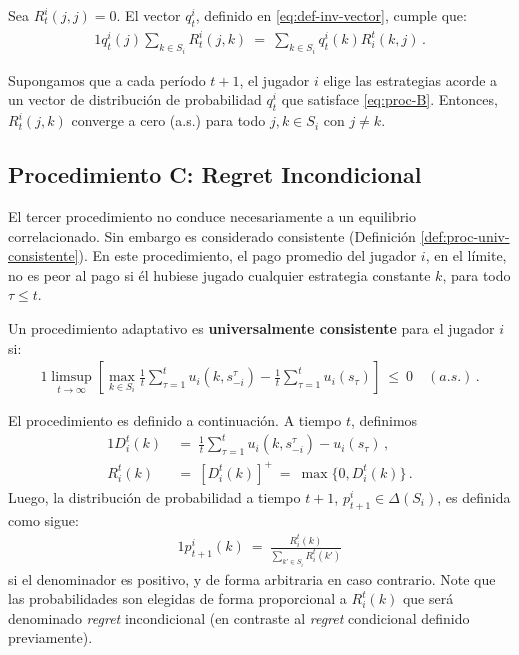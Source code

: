 \begin{theorem}
\label{theo:def-proc-B}
Sea $R_t^i(j, j) = 0$. El vector $q_t^i$, definido en \ref{eq:def-inv-vector}, cumple que:
\begin{alignat}{1}
\label{eq:proc-B}
q^i_t(j)\sum_{k \in S_i} R^i_t(j,k)\ =\ \sum_{k \in S_i} q_t^i(k)R_i^t(k,j) \,.
\end{alignat}
\end{theorem}

\begin{theorem}
\label{theo:conv-proc-B}
Supongamos que a cada período $t+1$, el jugador $i$ elige las estrategias acorde a un vector de distribución de probabilidad $q_t^i$ que satisface \eqref{eq:proc-B}. Entonces, $R^i_t(j, k)$ converge a cero (a.s.) para todo $j, k \in S_i$ con $j \neq k$.
\end{theorem}

\subsection*{Procedimiento C: Regret Incondicional}

El tercer procedimiento no conduce necesariamente a un equilibrio correlacionado. Sin embargo es considerado  consistente (Definición \ref{def:proc-univ-consistente}). En este procedimiento, el pago promedio del jugador $i$, en el límite, no es peor al pago si él hubiese jugado cualquier estrategia constante $k$, para todo $\tau \leq t$.

\begin{definition}
\label{def:proc-univ-consistente}
Un procedimiento adaptativo es \textbf{universalmente consistente} para el jugador $i$ si:
\begin{alignat}{1}
	\limsup_{t \rightarrow \infty } \left[ \max_{k \in S_i} \frac{1}{t} \sum_{\tau = 1}^{t} u_i(k, s_{-i}^{\tau}) - \frac{1}{t} \sum_{\tau = 1}^{t} u_i(s_{\tau}) \right]\ \leq\ 0\quad (a. s.) \,.
\end{alignat}
\end{definition}
El procedimiento es definido a continuación. A tiempo $t$, definimos
\begin{alignat}{1}
D_i^t(k)\ &=\ \frac{1}{t} \sum_{\tau = 1}^{t} u_i(k, s_{-i}^{\tau}) - u_i(s_{\tau}) \,, \\
R_i^t(k)\ &=\ [D_i^t(k)]^+\ =\ \max\{0, D_i^t(k)\} \,.
\end{alignat}
Luego, la distribución de probabilidad a tiempo $t+1$, $p_{t+1}^i \in \Delta(S_i)$, es definida como sigue:
\begin{alignat}{1}
\label{eq:proc-C}
  p_{t+1}^i(k)\ =\ \frac{R_i^t(k)}{\sum_{k'\in S_i} R_i^t(k')}
\end{alignat}
si el denominador es positivo, y de forma arbitraria en caso contrario. Note que las probabilidades son elegidas de forma proporcional a $R_i^t(k)$ que será denominado \textit{regret} incondicional (en contraste al \textit{regret} condicional definido previamente).

